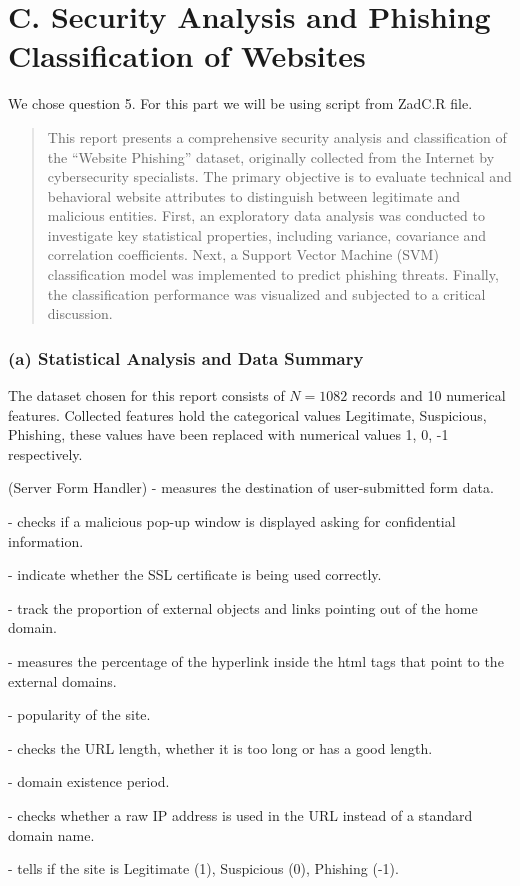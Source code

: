 \documentclass[12pt,a4paper]{article}
\begin{document}
	\clearpage
	\setcounter{section}{0}
	
	\part*{C. Security Analysis and Phishing Classification of Websites}
	We chose question 5. For this part we will be using script from ZadC.R file.
	\newline
	
	\begin{abstract}
		\noindent This report presents a comprehensive security analysis and classification of the ``Website Phishing'' dataset, originally collected from the Internet by cybersecurity specialists. The primary objective is to evaluate technical and behavioral website attributes to distinguish between legitimate and malicious entities. First, an exploratory data analysis was conducted to investigate key statistical properties, including variance, covariance and correlation coefficients. Next, a Support Vector Machine (SVM) classification model was implemented to predict phishing threats. Finally, the classification performance was visualized and subjected to a critical discussion.
	\end{abstract}
	
	\section{(a) Statistical Analysis and Data Summary}
	The dataset chosen for this report consists of $N = 1082$ records and 10 numerical features. Collected features hold the categorical values Legitimate, Suspicious, Phishing, these values have been replaced with numerical values 1, 0, -1 respectively.
	
	\begin{description}[itemsep=1pt, topsep=2pt, parsep=1pt]
		\item[SFH] (Server Form Handler) - measures the destination of user-submitted form data.
		\item[popUpWindow] - checks if a malicious pop-up window is displayed asking for confidential information.
		\item[SSLfinal\_State] - indicate whether the SSL certificate is being used correctly.
		\item[Request\_URL] - track the proportion of external objects and links pointing out of the home domain.
		\item[URL\_of\_Anchor] - measures the percentage of the hyperlink inside the html tags that point to the external domains.
		\item[web\_traffic] - popularity of the site.
		\item[URL\_Length] - checks the URL length, whether it is too long or has a good length.
		\item[age\_of\_domain] - domain existence period.
		\item[having\_IP\_Address] - checks whether a raw IP address is used in the URL instead of a standard domain name.
		\item[Result] - tells if the site is Legitimate (1), Suspicious (0), Phishing (-1).
	\end{description}
	
\end{document}
